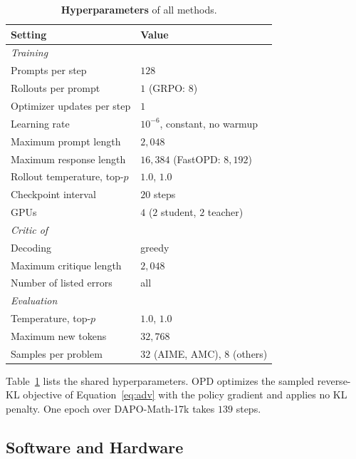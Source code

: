 \begin{table}[h]
\centering
\caption{\textbf{Hyperparameters} of all methods.}
\label{tab:hyper}
\scriptsize
\setlength{\tabcolsep}{4pt}
\renewcommand{\arraystretch}{1.08}
\begin{tabular}{ll}
\toprule
\textbf{Setting} & \textbf{Value} \\
\midrule
\multicolumn{2}{l}{\textit{Training}} \\
Prompts per step & $128$ \\
Rollouts per prompt & $1$ (GRPO: $8$) \\
Optimizer updates per step & $1$ \\
Learning rate & $10^{-6}$, constant, no warmup \\
Maximum prompt length & $2{,}048$ \\
Maximum response length & $16{,}384$ (FastOPD: $8{,}192$) \\
Rollout temperature, top-$p$ & $1.0$, $1.0$ \\
Checkpoint interval & $20$ steps \\
GPUs & $4$ ($2$ student, $2$ teacher) \\
\midrule
\multicolumn{2}{l}{\textit{Critic of \ours{}}} \\
Decoding & greedy \\
Maximum critique length & $2{,}048$ \\
Number of listed errors & all \\
\midrule
\multicolumn{2}{l}{\textit{Evaluation}} \\
Temperature, top-$p$ & $1.0$, $1.0$ \\
Maximum new tokens & $32{,}768$ \\
Samples per problem & $32$ (AIME, AMC), $8$ (others) \\
\bottomrule
\end{tabular}
\end{table}

Table~\ref{tab:hyper} lists the shared hyperparameters.
OPD optimizes the sampled reverse-KL objective of Equation~\eqref{eq:adv} with
the policy gradient and applies no KL penalty.
One epoch over DAPO-Math-17k takes $139$ steps.

\subsection{Software and Hardware}
\label{app:software}


